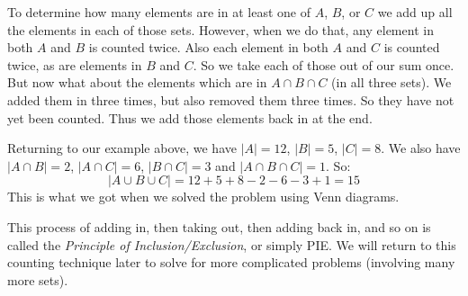\documentclass[12pt]{article}
\begin{document}
To determine how many elements are in at least one of $A$, $B$, or $C$ we add up all the elements in each of those sets.  However, when we do that, any element in both $A$ and $B$ is counted twice.  Also each element in both $A$ and $C$ is counted twice, as are elements in $B$ and $C$.  So we take each of those out of our sum once.  But now what about the elements which are in $A \cap B \cap C$ (in all three sets).  We added them in three times, but also removed them three times.  So they have not yet been counted.  Thus we add those elements back in at the end.

Returning to our example above, we have $|A| = 12$, $|B| = 5$, $|C| = 8$.  We also have $|A \cap B| = 2$, $|A \cap C| = 6$, $|B \cap C| = 3$ and $|A \cap B \cap C| = 1$.  So:
\[|A \cup B \cup C| = 12 + 5 + 8 - 2 - 6 - 3 + 1 = 15\]
This is what we got when we solved the problem using Venn diagrams.

This process of adding in, then taking out, then adding back in, and so on is called the {\em Principle of Inclusion/Exclusion}, or simply PIE.  We will return to this counting technique later to solve for more complicated problems (involving many more sets).
 
 
 
\end{document}
